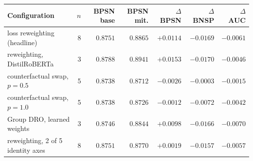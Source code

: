 \begin{tabular}{lrrrrrr}
\toprule
Configuration & $n$ & BPSN base & BPSN mit. & $\Delta$ BPSN & $\Delta$ BNSP & $\Delta$ AUC \\
\midrule
loss reweighting (headline) & 8 & $0.8751$ & $0.8865$ & $+0.0114$ & $-0.0169$ & $-0.0061$ \\
reweighting, DistilRoBERTa & 3 & $0.8788$ & $0.8941$ & $+0.0153$ & $-0.0170$ & $-0.0046$ \\
counterfactual swap, $p=0.5$ & 5 & $0.8738$ & $0.8712$ & $-0.0026$ & $-0.0003$ & $-0.0015$ \\
counterfactual swap, $p=1.0$ & 5 & $0.8738$ & $0.8726$ & $-0.0012$ & $-0.0072$ & $-0.0042$ \\
Group DRO, learned weights & 3 & $0.8746$ & $0.8844$ & $+0.0098$ & $-0.0166$ & $-0.0070$ \\
reweighting, 2 of 5 identity axes & 8 & $0.8751$ & $0.8770$ & $+0.0019$ & $-0.0157$ & $-0.0057$ \\
\bottomrule
\end{tabular}

